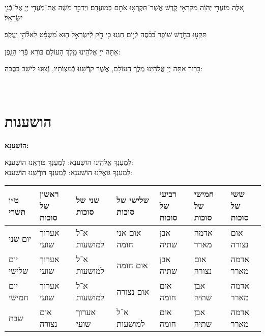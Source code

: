\documentclass[twoside, openany, parskip=half, 11pt]{book}
\begin{document}
\sepline

  אֵ֚לֶּה מוֹעֲדֵ֣י יְהֹוָ֔ה מִקְרָאֵ֖י קֹ֑דֶשׁ אֲשֶׁר־תִּקְרְא֥וּ אֹתָ֖ם בְּמוֹעֲדָֽם׃ וַיְדַבֵּ֣ר מֹשֶׁ֔ה אֶת־מֹֽעֲדֵ֖י יְיָ֑ אֶל־בְּֿֿנֵ֖י יִשְׂרָאֵֽל׃

\sepline

  תִּקְע֣וּ בַחֹ֣דֶשׁ שׁוֹפָ֑ר בַּ֝כֵּ֗סֶה לְֿי֣וֹם חַגֵּֽנוּ׃ כִּ֤י חֹ֣ק לְֿיִשְׂרָאֵ֣ל ה֑וּא מִ֝שְׁפָּ֗ט לֵאלֹ֘הֵ֥י יַֽעֲקֹֽב׃

\sepline


אַתָּה יְיָ אֱלֹהֵֽינוּ מֶֽלֶךְ הָעוֹלָם בּוֹרֵא פְּֿרִי הַגָֽפֶן:

\sepline
	
\begin{small}בָּרוּךְ אַתָּה יְיָ אֱלֹהֵינוּ מֶלֶךְ הָעוֹלָם, אֲשֶׁר קִדְּֿשָׁנוּ בְּֿמִצְוֹתָיו, וְֿצִוָּנוּ לֵישֵׁב בַּסֻּכָּה:\end{small} \\

\chapter[הושענות]{ הושענות }
\label{hoshanos}


\begin{Large}
	\textbf{
		הוֹשַׁענָא:
	}
\end{Large}


לְֿמַעַנְךָ אֱלֹהֵֽינוּ הוֹשַׁענָא: לְֿמַעַנְךָ בּוֹרְֿאֵֽנוּ הוֹשַׁענָא:\\
לְמַעַנְךָ גּוֹאֲלֵֽנוּ הוֹשַׁענָא: לְֿמַעַנְךָ דּוֹרְֿשֵֽׁנוּ הוֹשַׁענָא:

\begin{tiny}
	\begin{tabular}{>{\centering\arraybackslash}m{}||>{\centering\arraybackslash}m{}|>{\centering\arraybackslash}m{}|>{\centering\arraybackslash}m{}|>{\centering\arraybackslash}m{}|>{\centering\arraybackslash}m{}|>{\centering\arraybackslash}m{}}
		ט״ו תשרי & ראשון של סוכות & שני של סוכות & שלישי של סוכות & רביעי של סוכות & חמישי של סוכות & ששי של סוכות \\
		\hline \hline
		יום שני & אערוך שועי & א־ל למושעות & אום אני חומה & אבן שתיה & אדמה מארר & אום נצורה\\ \hline
		יום שלישי & אערוך שועי & א־ל למושעות & אום חומה & אבן שתיה & אום נצורה & אדמה מארר \\ \hline
		יום חמישי & אערוך שועי & א־ל למושעות & אום נצורה & אום חומה & אבן שתיה & אדמה מארר\\ \hline
		שבת & אום נצורה & אערוך שועי & א־ל למושעות & אום חומה & אבן שתיה & אדמה מארר
	\end{tabular}
	
\end{tiny}
\end{document}
